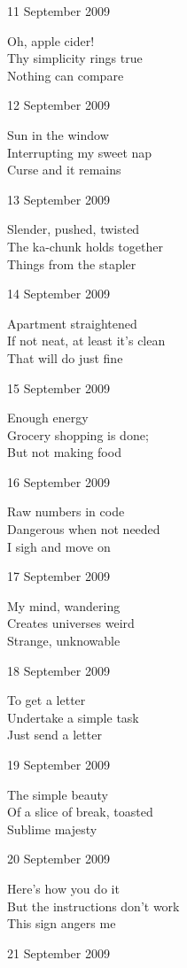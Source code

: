 \documentclass[12pt]{article}
\begin{document}
11 September 2009

Oh, apple cider! \\
Thy simplicity rings true \\
Nothing can compare

12 September 2009

Sun in the window \\ 
Interrupting my sweet nap \\
Curse and it remains

13 September 2009

Slender, pushed, twisted \\
The ka-chunk holds together \\
Things from the stapler

14 September 2009

Apartment straightened \\
If not neat, at least it's clean \\
That will do just fine

15 September 2009

Enough energy \\
Grocery shopping is done; \\
But not making food

16 September 2009

Raw numbers in code \\
Dangerous when not needed \\
I sigh and move on


\newpage

17 September 2009

My mind, wandering \\
Creates universes weird \\
Strange, unknowable

18 September 2009

To get a letter \\
Undertake a simple task \\
Just send a letter

19 September 2009

The simple beauty \\
Of a slice of break, toasted \\
Sublime majesty

20 September 2009

Here's how you do it \\
But the instructions don't work \\
This sign angers me

21 September 2009
\end{document}
